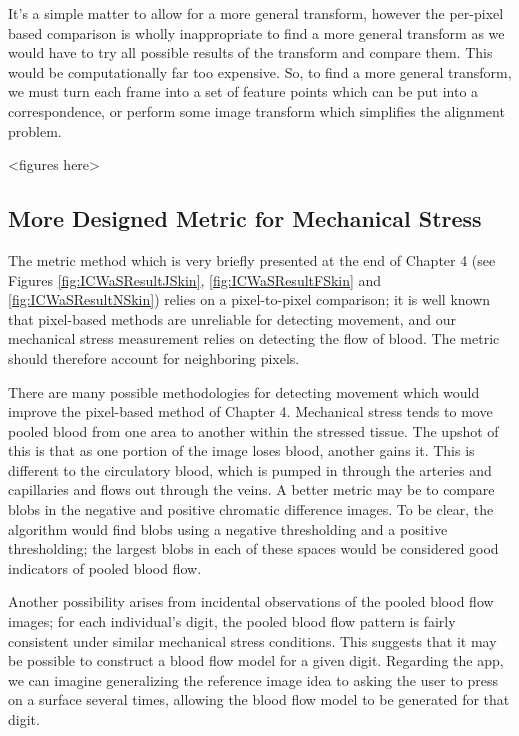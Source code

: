 It's a simple matter to allow for a more general transform, however the per-pixel based comparison is wholly inappropriate to find a more general transform as we would have to try all possible results of the transform and compare them. This would be computationally far too expensive. So, to find a more general transform, we must turn each frame into a set of feature points which can be put into a correspondence, or perform some image transform which simplifies the alignment problem.

<figures here>



\subsection{More Designed Metric for Mechanical Stress}\label{sec:MoreDesignedMetricForMechanicalStress}
The metric method which is very briefly presented at the end of Chapter 4 (see Figures \ref{fig:ICWaSResultJSkin}, \ref{fig:ICWaSResultFSkin} and \ref{fig:ICWaSResultNSkin}) relies on a pixel-to-pixel comparison; it is well known that pixel-based methods are unreliable for detecting movement, and our mechanical stress measurement relies on detecting the flow of blood. The metric should therefore account for neighboring pixels. 

There are many possible methodologies for detecting movement which would improve the pixel-based method of Chapter 4. Mechanical stress tends to move pooled blood from one area to another within the stressed tissue. The upshot of this is that as one portion of the image loses blood, another gains it. This is different to the circulatory blood, which is pumped in through the arteries and capillaries and flows out through the veins. A better metric may be to compare blobs in the negative and positive chromatic difference images. To be clear, the algorithm would find blobs using a negative thresholding and a positive thresholding; the largest blobs in each of these spaces would be considered good indicators of pooled blood flow.

Another possibility arises from incidental observations of the pooled blood flow images; for each individual's digit, the pooled blood flow pattern is fairly consistent under similar mechanical stress conditions. This suggests that it may be possible to construct a blood flow model for a given digit. Regarding the app, we can imagine generalizing the reference image idea to asking the user to press on a surface several times, allowing the blood flow model to be generated for that digit.

